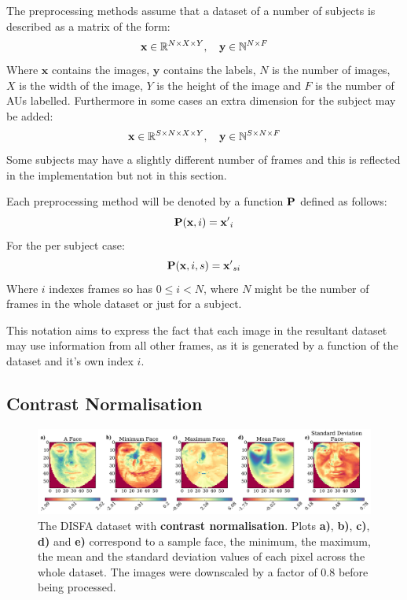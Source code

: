     The preprocessing methods assume that a dataset of a number of subjects
    is described as a matrix of the form:
    \begin{equation}
    {\bf x} \in \mathbb{R}^{N\times X \times Y},\quad {\bf y} \in \mathbb{N}^{N\times F}
    \end{equation}
    Where $\mathbf{x}$ contains the images, $\mathbf{y}$ contains the labels,
    $N$ is the number of images, $X$ is the width of the image, $Y$ is the height of the
    image and $F$ is the number of AUs labelled. Furthermore in some cases an extra dimension
    for the subject may be added:
    \begin{equation}
    {\bf x} \in \mathbb{R}^{S\times N\times X \times Y},\quad {\bf y} \in \mathbb{N}^{S\times N\times F}
    \end{equation}
    Some subjects may have a slightly different number of frames and this is reflected
    in the implementation but not in this section.

    Each preprocessing method will be denoted by a function ${\bf P}$ defined as follows:
    \begin{equation}
      {\bf P}({\bf x},i) = {\bf x'}_i
    \end{equation}
    For the per subject case:
    \begin{equation}
      {\bf P}({\bf x},i,s) = {\bf x'}_{si}
    \end{equation}
    Where $i$ indexes frames so has $0 \leq i < N$, where $N$ might be the number of frames
    in the whole dataset or just for a subject.

    This notation aims to express the fact that each image in the resultant dataset
    may use information from all other frames, as it is generated by a function of the dataset
    and it's own index $i$.

    \subsection{Contrast Normalisation}
      \begin{figure}[!h]
      \centering
      \includegraphics[width =\hsize]{figures/faces_contrast.pdf}
      \caption{The DISFA dataset with {\bf contrast normalisation}.
      Plots {\bf a)}, {\bf b)}, {\bf c)}, {\bf d)} and {\bf e)}
      correspond to a sample face, the minimum, the maximum,
      the mean and the standard deviation values of each pixel across
      the whole dataset. The images were downscaled by a factor of 0.8 before being processed.}
      \label{fig:simple}
      \end{figure}


